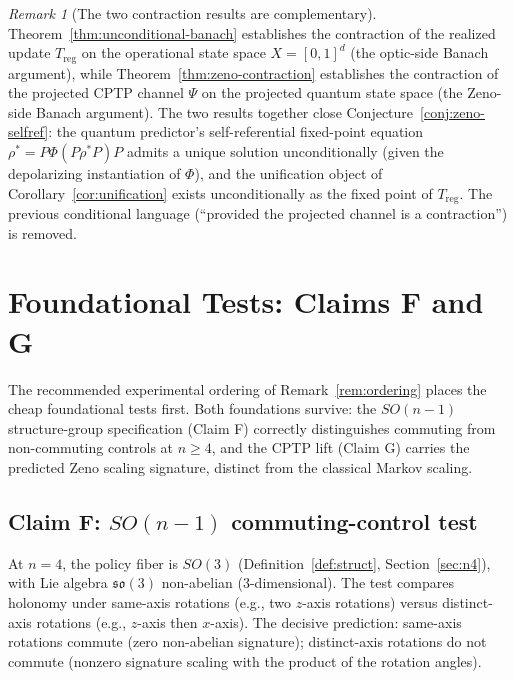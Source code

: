 \documentclass[11pt,a4paper]{article}
\theoremstyle{plain}
\theoremstyle{definition}
\theoremstyle{remark}
\newtheorem{remark}[theorem]{Remark}
\newcommand{\so}{\mathfrak{so}}
\begin{document}
\begin{remark}[The two contraction results are complementary]
\label{rem:two-contractions}
Theorem~\ref{thm:unconditional-banach} establishes the contraction of
the realized update $T_{\mathrm{reg}}$ on the operational state space
$X=[0,1]^{d}$ (the optic-side Banach argument), while
Theorem~\ref{thm:zeno-contraction} establishes the contraction of the
projected CPTP channel $\Psi$ on the projected quantum state space
(the Zeno-side Banach argument). The two results together close
Conjecture~\ref{conj:zeno-selfref}: the quantum predictor's
self-referential fixed-point equation $\rho^{*}=P\Phi(P\rho^{*}P)P$
admits a unique solution unconditionally (given the depolarizing
instantiation of $\Phi$), and the unification object of
Corollary~\ref{cor:unification} exists unconditionally as the fixed
point of $T_{\mathrm{reg}}$. The previous conditional language
(``provided the projected channel is a contraction'') is removed.
\end{remark}

\section{Foundational Tests: Claims F and G}\label{sec:foundational}

The recommended experimental ordering of Remark~\ref{rem:ordering}
places the cheap foundational tests first. Both foundations survive:
the $SO(n-1)$ structure-group specification (Claim F) correctly
distinguishes commuting from non-commuting controls at $n\geq 4$, and
the CPTP lift (Claim G) carries the predicted Zeno scaling signature,
distinct from the classical Markov scaling.

\subsection{Claim F: $SO(n-1)$ commuting-control test}

At $n=4$, the policy fiber is $SO(3)$ (Definition~\ref{def:struct},
Section~\ref{sec:n4}), with Lie algebra $\so(3)$ non-abelian
($3$-dimensional). The test compares holonomy under same-axis
rotations (e.g., two $z$-axis rotations) versus distinct-axis
rotations (e.g., $z$-axis then $x$-axis). The decisive prediction:
same-axis rotations commute (zero non-abelian signature); distinct-axis
rotations do not commute (nonzero signature scaling with the product
of the rotation angles).
\end{document}
